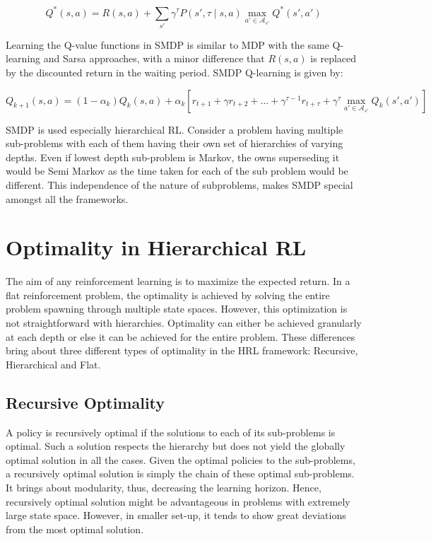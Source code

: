 \begin{equation}
    Q^* (s,a)=R(s,a) + \sum_{s'} \gamma^\tau P(s', \tau \mid s,a)   \max_{a' \in \mathcal{A}_{s'}}⁡ Q^* (s',a')
\end{equation}

Learning the Q-value functions in SMDP is similar to MDP with the same Q-learning and Sarsa approaches, with a minor difference that \(R(s,a)\) is replaced by the discounted return in the waiting period. SMDP Q-learning is given by:

\begin{equation}
    Q_{k+1} (s,a)=(1-\alpha_k ) Q_k (s,a)+\alpha_k[r_{t+1}+\gamma r_{t+2}+ \dots + \gamma^{\tau-1} r_{t+\tau}+ \gamma ^\tau   \max_{a' \in \mathcal{A}_{s'}}⁡ Q_k (s',a' )]
\end{equation}

SMDP is used especially hierarchical RL. Consider a problem having multiple sub-problems with each of them having their own set of hierarchies of varying depths. Even if lowest depth sub-problem is Markov, the owns superseding it would be Semi Markov as the time taken for each of the sub problem would be different. This independence of the nature of subproblems, makes SMDP special amongst all the frameworks.  

\section{Optimality in Hierarchical RL}

The aim of any reinforcement learning is to maximize the expected return. In a flat reinforcement problem, the optimality is achieved by solving the entire problem spawning through multiple state spaces. However, this optimization is not straightforward with hierarchies. Optimality can either be achieved granularly at each depth or else it can be achieved for the entire problem. These differences bring about three different types of optimality in the HRL framework: Recursive, Hierarchical and Flat. 

\subsection{Recursive Optimality}
A policy is recursively optimal if the solutions to each of its sub-problems is optimal. Such a solution respects the hierarchy but does not yield the globally optimal solution in all the cases. Given the optimal policies to the sub-problems, a recursively optimal solution is simply the chain of these optimal sub-problems. It brings about modularity, thus, decreasing the learning horizon. Hence, recursively optimal solution might be advantageous in problems with extremely large state space. However, in smaller set-up, it tends to show great deviations from the most optimal solution. 

